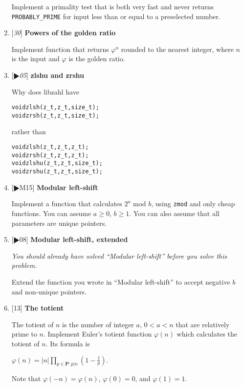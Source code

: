 \begin{enumerate}[label=\textbf{\arabic*}.]
Implement a primality test that is both very fast and
never returns \texttt{PROBABLY\_PRIME} for input less
than or equal to a preselected number.



\item {[\textit{30}]} \textbf{Powers of the golden ratio}

Implement function that returns $\varphi^n$ rounded
to the nearest integer, where $n$ is the input and
$\varphi$ is the golden ratio.



\item {[\textit{$\RHD$05}]} \textbf{zlshu and zrshu}

Why does libzahl have

\vspace{-1em}
\begin{alltt}
   void zlsh(z_t, z_t, size_t);
   void zrsh(z_t, z_t, size_t);
\end{alltt}
\vspace{-1em}

\noindent
rather than

\vspace{-1em}
\begin{alltt}
   void zlsh(z_t, z_t, z_t);
   void zrsh(z_t, z_t, z_t);
   void zlshu(z_t, z_t, size_t);
   void zrshu(z_t, z_t, size_t);
\end{alltt}
\vspace{-1em}



\item {[$\RHD$M15]} \textbf{Modular left-shift}

Implement a function that calculates
$2^a \text{ mod } b$, using \texttt{zmod} and
only cheap functions. You can assume $a \ge 0$,
 $b \ge 1$. You can also assume that all
parameters are unique pointers.



\item {[$\RHD$08]} \textbf{Modular left-shift, extended}

{\small\textit{You should already have solved
``Modular left-shift'' before you solve this
problem.}}

Extend the function you wrote in ``Modular left-shift''
to accept negative $b$ and non-unique pointers.



\item {[13]} \textbf{The totient}

The totient of $n$ is the number of integer $a$,
$0 < a < n$ that are relatively prime to $n$.
Implement Euler's totient function $\varphi(n)$
which calculates the totient of $n$. Its
formula is

\( \displaystyle{
    \varphi(n) = |n| \prod_{p \in \textbf{P} : p | n}
    \left ( 1 - \frac{1}{p} \right ).
}\)

Note that $\varphi(-n) = \varphi(n)$, $\varphi(0) = 0$,
and $\varphi(1) = 1$.



\end{enumerate}



